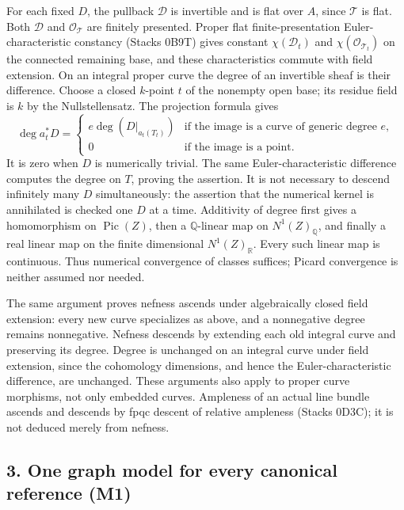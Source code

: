 \documentclass[
  10pt,
]{article}
\begin{document}
For each fixed \(D\), the pullback \(\mathcal D\) is invertible and is
flat over \(A\), since \(\mathcal T\) is flat. Both \(\mathcal D\) and
\(\mathcal O_\mathcal T\) are finitely presented. Proper flat
finite-presentation Euler-characteristic constancy (Stacks 0B9T) gives
constant \(\chi(\mathcal D_t)\) and \(\chi(\mathcal O_{\mathcal T_t})\)
on the connected remaining base, and these characteristics commute with
field extension. On an integral proper curve the degree of an invertible
sheaf is their difference. Choose a closed \(k\)-point \(t\) of the
nonempty open base; its residue field is \(k\) by the Nullstellensatz.
The projection formula gives \[\deg a_t^*D=\begin{cases}
e\deg(D|_{a_t(T_t)})&\text{if the image is a curve of generic degree }e,\\
0&\text{if the image is a point}.
\end{cases}\] It is zero when \(D\) is numerically trivial. The same
Euler-characteristic difference computes the degree on \(T\), proving
the assertion. It is not necessary to descend infinitely many \(D\)
simultaneously: the assertion that the numerical kernel is annihilated
is checked one \(D\) at a time. Additivity of degree first gives a
homomorphism on \(\operatorname{Pic}(Z)\), then a \(\mathbb Q\)-linear
map on \(N^1(Z)_\mathbb Q\), and finally a real linear map on the finite
dimensional \(N^1(Z)_\mathbb R\). Every such linear map is continuous.
Thus numerical convergence of classes suffices; Picard convergence is
neither assumed nor needed.

The same argument proves nefness ascends under algebraically closed
field extension: every new curve specializes as above, and a nonnegative
degree remains nonnegative. Nefness descends by extending each old
integral curve and preserving its degree. Degree is unchanged on an
integral curve under field extension, since the cohomology dimensions,
and hence the Euler-characteristic difference, are unchanged. These
arguments also apply to proper curve morphisms, not only embedded
curves. Ampleness of an actual line bundle ascends and descends by fpqc
descent of relative ampleness (Stacks 0D3C); it is not deduced merely
from nefness.

\subsection{3. One graph model for every canonical reference
(M1)}\label{one-graph-model-for-every-canonical-reference-m1}
\end{document}

